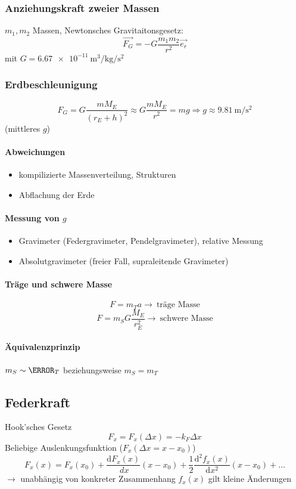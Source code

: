 \documentclass[a4paper]{scrartcl}
\renewcommand{\d}{\mathrm{d}}
\renewcommand{\v}[1]{\vec{#1}}
\newcommand{\dd}[2]{\frac{\d #1}{\ d#2}}
\theoremstyle{definition}
\theoremstyle{plain}
\theoremstyle{plain}
\theoremstyle{remark}
\theoremstyle{remark}
\theoremstyle{remark}
\begin{document}
\subsubsection{Anziehungskraft zweier Massen}
\label{sec-3-1-1}
$m_1,m_2$ Massen, Newtonsches Gravitaitonsgesetz:
\[\v{F_G} = -G\frac{m_1 m_2}{r^2}\v{e_r}\]
mit $G=\SI{6.67e-11}{\meter\cubed\per\kilo\gram\per\second\squared}$
\subsubsection{Erdbeschleunigung}
\label{sec-3-1-2}
\[F_G = G\frac{m M_E}{(r_E + h)^2} \approx G\frac{m M_E}{r^2} = m g \Rightarrow g\approx \SI{9.81}{\meter\per\second\squared}\]
(mittleres $g$) \\
\paragraph{Abweichungen}
\label{sec-3-1-2-1}
\begin{itemize}
\item kompilizierte Massenverteilung, Strukturen
\item Abflachung der Erde
\end{itemize}
\paragraph{Messung von $g$}
\label{sec-3-1-2-2}
\begin{itemize}
\item Gravimeter (Federgravimeter, Pendelgravimeter), relative Messung
\item Absolutgravimeter (freier Fall, supraleitende Gravimeter)
\end{itemize}
\paragraph{Träge und schwere Masse}
\label{sec-3-1-2-3}
\[F= m_T a \rightarrow ~\text{träge Masse}\]
\[F= m_S G\frac{M_E}{r_E^2} \rightarrow ~\text{schwere Masse}\]
\paragraph{Äquivalenzprinzip}
\label{sec-3-1-2-4}
$m_S \sim \m_T$ beziehungsweise $m_S = m_T$
\subsection{Federkraft}
\label{sec-3-2}
Hook'sches Gesetz
\[F_x = F_x(\Delta x) = -k_F \Delta x\]
Beliebige Auslenkungsfunktion ($F_x(\Delta x = x - x_0)$)
\[F_x(x) = F_x(x_0) + \dd{F_x(x)}{x}(x-x_0) + \frac{1}{2}\frac{\d^2 f_x(x)}{\d x^2}(x - x_0) + \ldots\]
$\rightarrow$ unabhängig von konkreter Zusammenhang $f_x(x)$ gilt kleine Änderungen
\end{document}
